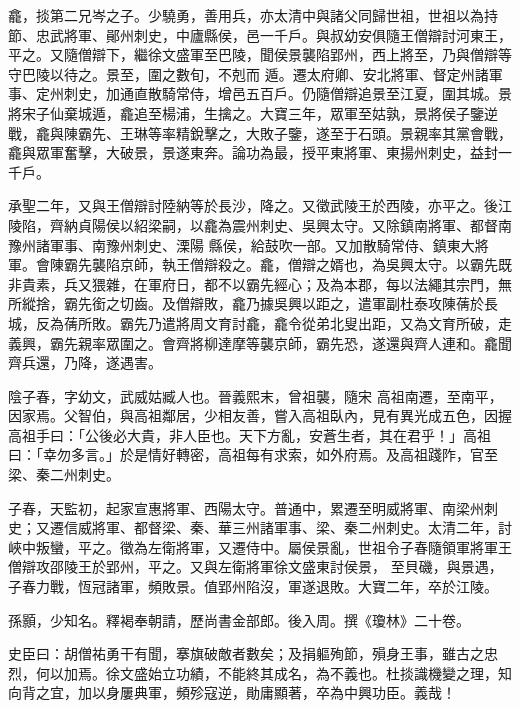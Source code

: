 \begin{pinyinscope}
 龕，掞第二兄岑之子。少驍勇，善用兵，亦太清中與諸父同歸世祖，世祖以為持節、忠武將軍、鄖州刺史，中廬縣侯，邑一千戶。與叔幼安俱隨王僧辯討河東王，平之。又隨僧辯下，繼徐文盛軍至巴陵，聞侯景襲陷郢州，西上將至，乃與僧辯等守巴陵以待之。景至，圍之數旬，不剋而
 遁。遷太府卿、安北將軍、督定州諸軍事、定州刺史，加通直散騎常侍，增邑五百戶。仍隨僧辯追景至江夏，圍其城。景將宋子仙棄城遁，龕追至楊浦，生擒之。大寶三年，眾軍至姑孰，景將侯子鑒逆戰，龕與陳霸先、王琳等率精銳擊之，大敗子鑒，遂至于石頭。景親率其黨會戰，龕與眾軍奮擊，大破景，景遂東奔。論功為最，授平東將軍、東揚州刺史，益封一千戶。



 承聖二年，又與王僧辯討陸納等於長沙，降之。又徵武陵王於西陵，亦平之。後江陵陷，齊納貞陽侯以紹梁嗣，以龕為震州刺史、吳興太守。又除鎮南將軍、都督南豫州諸軍事、南豫州刺史、溧陽
 縣侯，給鼓吹一部。又加散騎常侍、鎮東大將軍。會陳霸先襲陷京師，執王僧辯殺之。龕，僧辯之婿也，為吳興太守。以霸先既非貴素，兵又猥雜，在軍府日，都不以霸先經心；及為本郡，每以法繩其宗門，無所縱捨，霸先銜之切齒。及僧辯敗，龕乃據吳興以距之，遣軍副杜泰攻陳蒨於長城，反為蒨所敗。霸先乃遣將周文育討龕，龕令從弟北叟出距，又為文育所破，走義興，霸先親率眾圍之。會齊將柳達摩等襲京師，霸先恐，遂還與齊人連和。龕聞齊兵還，乃降，遂遇害。



 陰子春，字幼文，武威姑臧人也。晉義熙末，曾祖襲，隨宋
 高祖南遷，至南平，因家焉。父智伯，與高祖鄰居，少相友善，嘗入高祖臥內，見有異光成五色，因握高祖手曰：「公後必大貴，非人臣也。天下方亂，安蒼生者，其在君乎！」高祖曰：「幸勿多言。」於是情好轉密，高祖每有求索，如外府焉。及高祖踐阼，官至梁、秦二州刺史。



 子春，天監初，起家宣惠將軍、西陽太守。普通中，累遷至明威將軍、南梁州刺史；又遷信威將軍、都督梁、秦、華三州諸軍事、梁、秦二州刺史。太清二年，討峽中叛蠻，平之。徵為左衛將軍，又遷侍中。屬侯景亂，世祖令子春隨領軍將軍王僧辯攻邵陵王於郢州，平之。又與左衛將軍徐文盛東討侯景，
 至貝磯，與景遇，子春力戰，恆冠諸軍，頻敗景。值郢州陷沒，軍遂退敗。大寶二年，卒於江陵。



 孫顥，少知名。釋褐奉朝請，歷尚書金部郎。後入周。撰《瓊林》二十卷。



 史臣曰：胡僧祐勇干有聞，搴旗破敵者數矣；及捐軀殉節，殞身王事，雖古之忠烈，何以加焉。徐文盛始立功績，不能終其成名，為不義也。杜掞識機變之理，知向背之宜，加以身屢典軍，頻殄寇逆，勛庸顯著，卒為中興功臣。義哉！



\end{pinyinscope}